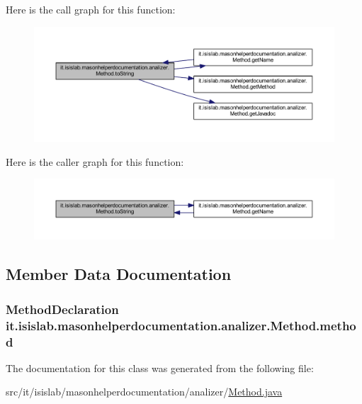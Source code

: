 Here is the call graph for this function\-:\nopagebreak
\begin{figure}[H]
\begin{center}
\leavevmode
\includegraphics[width=350pt]{classit_1_1isislab_1_1masonhelperdocumentation_1_1analizer_1_1_method_abd783b39c400e8db1f5e0f08c00c8e5a_cgraph}
\end{center}
\end{figure}




Here is the caller graph for this function\-:\nopagebreak
\begin{figure}[H]
\begin{center}
\leavevmode
\includegraphics[width=350pt]{classit_1_1isislab_1_1masonhelperdocumentation_1_1analizer_1_1_method_abd783b39c400e8db1f5e0f08c00c8e5a_icgraph}
\end{center}
\end{figure}




\subsection{Member Data Documentation}
\hypertarget{classit_1_1isislab_1_1masonhelperdocumentation_1_1analizer_1_1_method_a86b6aa02f4993d83ee78e19f1f211130}{
\subsubsection[{method}]{\setlength{\rightskip}{0pt plus 5cm}Method\-Declaration it.\-isislab.\-masonhelperdocumentation.\-analizer.\-Method.\-method\hspace{0.3cm}{\ttfamily [private]}}}\label{classit_1_1isislab_1_1masonhelperdocumentation_1_1analizer_1_1_method_a86b6aa02f4993d83ee78e19f1f211130}


The documentation for this class was generated from the following file\-:\begin{DoxyCompactItemize}
\item 
src/it/isislab/masonhelperdocumentation/analizer/\hyperlink{_method_8java}{Method.\-java}\end{DoxyCompactItemize}
